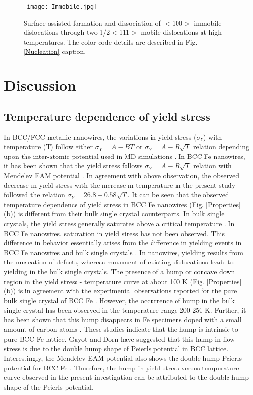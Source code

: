 \documentclass[%
reprint,%
 amssymb, amsmath,%
 aip,apl,%
]{revtex4-1}
\begin{document}
\begin{figure}
\centering
\texttt{[image: Immobile.jpg]}
\caption {Surface assisted formation and dissociation of $<$100$>$ immobile dislocations through two 1/2$<$111$>$ mobile 
dislocations at high temperatures. The color code details are described in Fig. \ref{Nucleation} caption.}
\label{Immobile}
\end{figure}

\section{Discussion}

\subsection{Temperature dependence of yield stress}

In BCC/FCC metallic nanowires, the variations in yield stress ($\sigma_Y$) with temperature (T) follow either $\sigma_Y = A - BT$ 
or $\sigma_Y = A - B\sqrt{T}$ relation depending upon the inter-atomic potential used in MD simulations \cite{Cai-Review,Rabkin}. 
In BCC Fe nanowires, it has been shown that the yield stress follows $\sigma_Y = A - B\sqrt{T}$ relation with Mendelev EAM potential 
\cite{Kotrechko}. In agreement with above observation, the observed decrease in yield stress with the increase in temperature in the 
present study followed the relation  $\sigma_Y = 26.8 - 0.58\sqrt{T}$. It can be seen that the observed temperature dependence of 
yield stress in BCC Fe nanowires (Fig. \ref{Properties}(b)) is different from their bulk single crystal counterparts. In bulk single 
crystals, the yield stress generally saturates above a critical temperature \cite{MSEA-Hump,Diehl-Hump,Tangri-Hump,Kuramoto-Hump}. 
In BCC Fe nanowires, saturation in yield stress has not been observed. This difference in behavior essentially arises from the 
difference in yielding events in BCC Fe nanowires and bulk single crystals \cite{Kotrechko}. In nanowires, yielding results from the
nucleation of defects, whereas movement of existing dislocations leads to yielding in the bulk single crystals. The presence of a 
hump or concave down region in the yield stress - temperature curve at about 100 K (Fig. \ref{Properties}(b)) is in agreement with 
the experimental observations reported for the pure bulk single crystal of BCC Fe \cite{MSEA-Hump,Diehl-Hump,Tangri-Hump,Kuramoto-Hump}. 
However, the occurrence of hump in the bulk single crystal has been observed in the temperature range 200-250 K. Further, it has been 
shown that this hump disappears in Fe specimens doped with a small amount of carbon atoms \cite{MSEA-Hump,Diehl-Hump}. These studies 
indicate that the hump is intrinsic to pure BCC Fe lattice. Guyot and Dorn \cite{Guyot-Dorn} have suggested that this hump in flow 
stress is due to the double hump shape of Peierls potential in BCC lattice. Interestingly, the Mendelev EAM potential also shows the
double hump Peierls potential for BCC Fe \cite{Ventelon}. Therefore, the hump in yield stress versus temperature curve observed in
the present investigation can be attributed to the double hump shape of the Peierls potential.
\end{document}
